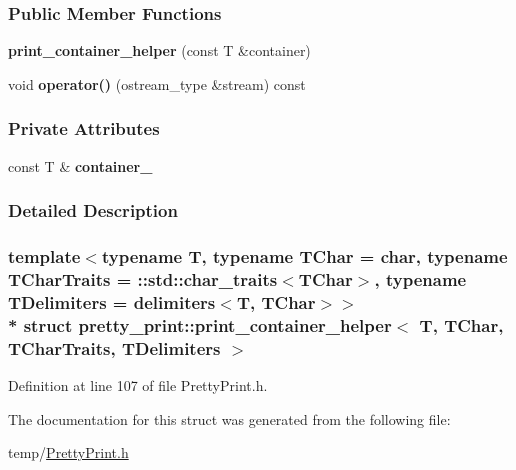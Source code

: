 \subsubsection*{Public Member Functions}
\begin{DoxyCompactItemize}
\item 
{\bfseries print\+\_\+container\+\_\+helper} (const T \&container)\hypertarget{structpretty__print_1_1print__container__helper_a95d852ee373f7dda926c62a54a49d66f}{}\label{structpretty__print_1_1print__container__helper_a95d852ee373f7dda926c62a54a49d66f}

\item 
void {\bfseries operator()} (ostream\+\_\+type \&stream) const \hypertarget{structpretty__print_1_1print__container__helper_af4f8639d3924c3458d9daa212579305a}{}\label{structpretty__print_1_1print__container__helper_af4f8639d3924c3458d9daa212579305a}

\end{DoxyCompactItemize}
\subsubsection*{Private Attributes}
\begin{DoxyCompactItemize}
\item 
const T \& {\bfseries container\+\_\+}\hypertarget{structpretty__print_1_1print__container__helper_ae66120f64952ac29b0100798eb394191}{}\label{structpretty__print_1_1print__container__helper_ae66120f64952ac29b0100798eb394191}

\end{DoxyCompactItemize}


\subsubsection{Detailed Description}
\subsubsection*{template$<$typename T, typename T\+Char = char, typename T\+Char\+Traits = \+::std\+::char\+\_\+traits$<$\+T\+Char$>$, typename T\+Delimiters = delimiters$<$\+T, T\+Char$>$$>$\\*
struct pretty\+\_\+print\+::print\+\_\+container\+\_\+helper$<$ T, T\+Char, T\+Char\+Traits, T\+Delimiters $>$}



Definition at line 107 of file Pretty\+Print.\+h.



The documentation for this struct was generated from the following file\+:\begin{DoxyCompactItemize}
\item 
temp/\hyperlink{PrettyPrint_8h}{Pretty\+Print.\+h}\end{DoxyCompactItemize}
